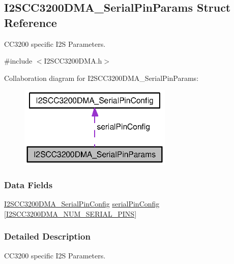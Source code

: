 \subsection{I2\+S\+C\+C3200\+D\+M\+A\+\_\+\+Serial\+Pin\+Params Struct Reference}
\label{struct_i2_s_c_c3200_d_m_a___serial_pin_params}


C\+C3200 specific I2\+S Parameters.  




{\ttfamily \#include $<$I2\+S\+C\+C3200\+D\+M\+A.\+h$>$}



Collaboration diagram for I2\+S\+C\+C3200\+D\+M\+A\+\_\+\+Serial\+Pin\+Params\+:
\nopagebreak
\begin{figure}[H]
\begin{center}
\leavevmode
\includegraphics[width=207pt]{struct_i2_s_c_c3200_d_m_a___serial_pin_params__coll__graph}
\end{center}
\end{figure}
\subsubsection*{Data Fields}
\begin{DoxyCompactItemize}
\item 
\hyperlink{struct_i2_s_c_c3200_d_m_a___serial_pin_config}{I2\+S\+C\+C3200\+D\+M\+A\+\_\+\+Serial\+Pin\+Config} \hyperlink{struct_i2_s_c_c3200_d_m_a___serial_pin_params_afba3cb7ac6b799fefacb4e64c7a91781}{serial\+Pin\+Config} \mbox{[}\hyperlink{_i2_s_c_c3200_d_m_a_8h_a16c3369e33e69e4d870c2093e4451c03}{I2\+S\+C\+C3200\+D\+M\+A\+\_\+\+N\+U\+M\+\_\+\+S\+E\+R\+I\+A\+L\+\_\+\+P\+I\+N\+S}\mbox{]}
\end{DoxyCompactItemize}


\subsubsection{Detailed Description}
C\+C3200 specific I2\+S Parameters. 

